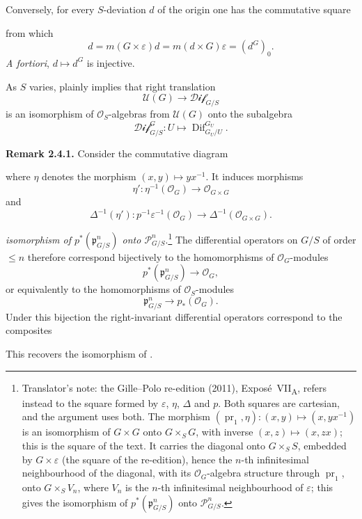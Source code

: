Conversely, for every \(S\)-deviation \(d\) of the origin one has the
commutative square
\begin{center}
  \label{sga3:VIIA:2.4-origin-value-square}
  
\end{center}
from which
\[
  d=m(G\times\varepsilon)d
   =m(d\times G)\varepsilon
   =(d^G)_0.
\]
\textit{A fortiori}, \(d\mapsto d^G\) is injective.

As \(S\) varies,  plainly implies that right translation
\[
  \mathcal U(G)\longrightarrow\mathcal{Dif}_{G/S}
\]
is an isomorphism of \(\mathcal O_S\)-algebras from \(\mathcal U(G)\)
onto the subalgebra
\[
  \mathcal{Dif}^{G}_{G/S}:U\longmapsto
  \operatorname{Dif}^{G_U}_{G_U/U}.
\]

\medskip
\noindent\textbf{Remark 2.4.1.}
\label{sga3:VIIA:2.4.1}
Consider the commutative diagram
\begin{center}
  \label{sga3:VIIA:2.4.1-eta-cartesian-square}
  
\end{center}
where \(\eta\) denotes the morphism
\((x,y)\mapsto yx^{-1}\).
It induces morphisms
\[
  \eta':\eta^{-1}(\mathcal O_G)\longrightarrow\mathcal O_{G\times G}
\]
and
\[
  \Delta^{-1}(\eta'):
  p^{-1}\varepsilon^{-1}(\mathcal O_G)
  \longrightarrow\Delta^{-1}(\mathcal O_{G\times G}).
\]

\emph{isomorphism of \(p^*(\mathfrak p^n_{G/S})\) onto
\(\mathcal P^n_{G/S}\)}.\footnote{Translator's note: the Gille--Polo
re-edition (2011), Expos\'e~VII\textsubscript{A}, refers instead to the
square formed by \(\varepsilon\), \(\eta\), \(\Delta\) and \(p\). Both
squares are cartesian, and the argument uses both. The morphism
\((\operatorname{pr}_1,\eta):(x,y)\mapsto(x,yx^{-1})\) is an isomorphism
of \(G\times G\) onto \(G\times_SG\), with inverse \((x,z)\mapsto(x,zx)\);
this is the square of the text. It carries the diagonal onto
\(G\times_SS\), embedded by \(G\times\varepsilon\) (the square of the
re-edition), hence the \(n\)-th infinitesimal neighbourhood of the
diagonal, with its \(\mathcal O_G\)-algebra structure through
\(\operatorname{pr}_1\), onto \(G\times_SV_n\), where \(V_n\) is the
\(n\)-th infinitesimal neighbourhood of \(\varepsilon\); this gives the
isomorphism of \(p^*(\mathfrak p^n_{G/S})\) onto
\(\mathcal P^n_{G/S}\).}
The differential operators on \(G/S\) of order \(\leq n\) therefore
correspond bijectively to the homomorphisms of
\(\mathcal O_G\)-modules
\[
  p^*(\mathfrak p^n_{G/S})\longrightarrow\mathcal O_G,
\]
or equivalently to the homomorphisms of \(\mathcal O_S\)-modules
\[
  \mathfrak p^n_{G/S}\longrightarrow p_*(\mathcal O_G).
\]
Under this bijection the right-invariant differential operators
correspond to the composites
\begin{center}
  \label{sga3:VIIA:2.4.1-invariant-factorization}
  
\end{center}
This recovers the isomorphism of .

